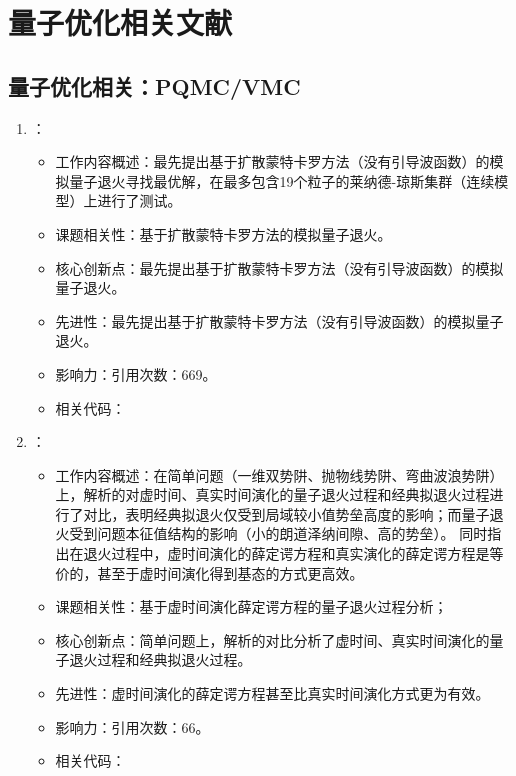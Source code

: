 \chapter{量子优化相关文献}
\section{量子优化相关：PQMC/VMC}
    \begin{enumerate}
        \item \citet{finnila1994quantum}：
            \begin{itemize}
                \item 工作内容概述：最先提出基于扩散蒙特卡罗方法（没有引导波函数）的模拟量子退火寻找最优解，在最多包含19个粒子的莱纳德-琼斯集群（连续模型）上进行了测试。
                \item 课题相关性：基于扩散蒙特卡罗方法的模拟量子退火。
                \item 核心创新点：最先提出基于扩散蒙特卡罗方法（没有引导波函数）的模拟量子退火。
                \item 先进性：最先提出基于扩散蒙特卡罗方法（没有引导波函数）的模拟量子退火。
                \item 影响力：引用次数：669。
                \item 相关代码：
            \end{itemize}
            \item \citet{stella2005optimization}：
            \begin{itemize}
                \item 工作内容概述：在简单问题（一维双势阱、抛物线势阱、弯曲波浪势阱）上，解析的对虚时间、真实时间演化的量子退火过程和经典拟退火过程进行了对比，表明经典拟退火仅受到局域较小值势垒高度的影响；而量子退火受到问题本征值结构的影响（小的朗道泽纳间隙、高的势垒）。
                同时指出在退火过程中，虚时间演化的薛定谔方程和真实演化的薛定谔方程是等价的，甚至于虚时间演化得到基态的方式更高效。
                \item 课题相关性：基于虚时间演化薛定谔方程的量子退火过程分析；
                \item 核心创新点：简单问题上，解析的对比分析了虚时间、真实时间演化的量子退火过程和经典拟退火过程。
                \item 先进性：虚时间演化的薛定谔方程甚至比真实时间演化方式更为有效。
                \item 影响力：引用次数：66。
                \item 相关代码：
            \end{itemize}

\end{enumerate}
